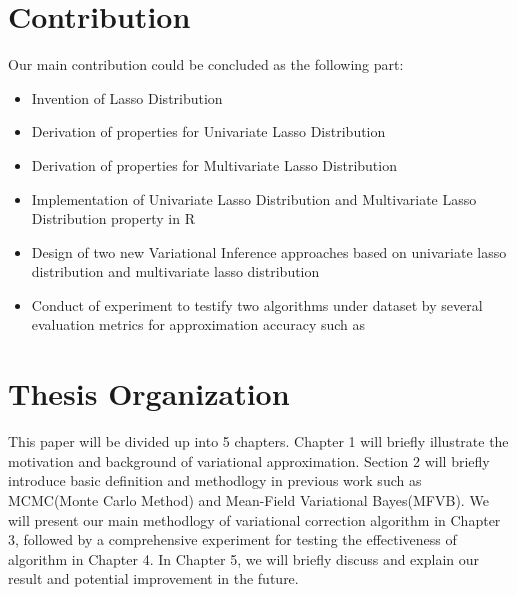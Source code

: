 \section{Contribution}
\label{cont}
Our main contribution could be concluded as the following part:
\begin{itemize}
	\item Invention of Lasso Distribution
	\item Derivation of properties for Univariate Lasso Distribution
	\item Derivation of properties for Multivariate Lasso Distribution
	\item Implementation of Univariate Lasso Distribution and Multivariate Lasso Distribution property in R
	\item Design of two new Variational Inference approaches based on univariate lasso distribution and multivariate lasso distribution
	\item Conduct of experiment to testify two algorithms under  dataset by several evaluation metrics for approximation accuracy such as
\end{itemize}



\section{Thesis Organization}
This paper will be divided up into 5 chapters. Chapter 1 will briefly illustrate the motivation and background of variational approximation. Section 2 will briefly introduce basic definition and methodlogy in previous work such as MCMC(Monte Carlo Method) and Mean-Field Variational Bayes(MFVB). We will present our main methodlogy of variational correction algorithm in Chapter 3, followed by a comprehensive experiment for testing the effectiveness of algorithm in Chapter 4. In Chapter 5, we will briefly discuss and explain our result and potential improvement in the future. 



 